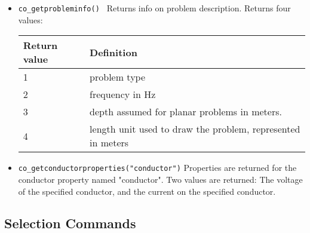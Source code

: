\begin{itemize}
\item \texttt{co\_getprobleminfo() }
Returns info on problem description. Returns four values:

\begin{tabular}{ll} \hline
Return value & Definition \\ \hline
1 &  problem type  \\
2 &  frequency in Hz \\
3 &  depth assumed for planar problems in meters.\\
4 &  length unit used to draw the problem, represented in meters
\end{tabular}

\item \texttt{co\_getconductorproperties("conductor")} Properties are returned for the
conductor property named "conductor". Two values are returned: The voltage
of the specified conductor, and the current on the specified
conductor.
\end{itemize}

\subsection{Selection Commands}

